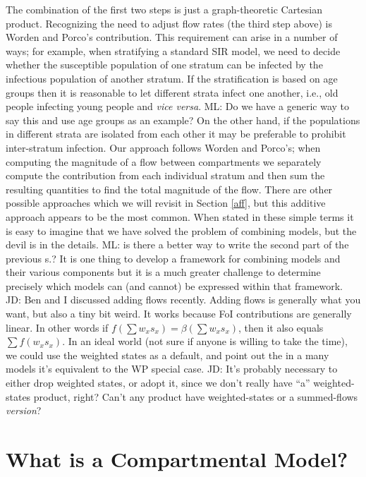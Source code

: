\documentclass[referee,sn-basic]{sn-jnl}%
\theoremstyle{definition}
\newcommand{\jd}[1]{{\color{blue} JD: #1}}
\newcommand{\mli}[1]{{\color{purple} ML: #1}}
\newcommand{\vv}{{\emph{vice versa}\xspace}}
\begin{document}
The combination of the first two steps is just a graph-theoretic Cartesian product. Recognizing the need to adjust flow rates (the third step above) is Worden and Porco's contribution. This requirement can arise in a number of ways; for example, when stratifying a standard SIR model, we need to decide whether the susceptible population of one stratum can be infected by the infectious population of another stratum.
If the stratification is based on age groups then it is reasonable to let different strata infect one another, i.e., old people infecting young people and \vv. \mli{Do we have a generic way to say this and use age groups as an example?}
On the other hand, if the populations in different strata are isolated from each other it may be preferable to prohibit inter-stratum infection. Our approach follows Worden and Porco's; when computing the magnitude of a flow between compartments we separately compute the contribution from each individual stratum and then sum the resulting quantities to find the total magnitude of the flow. There are other possible approaches which we will revisit in Section \ref{aff}, but this additive approach appears to be the most common. When stated in these simple terms it is easy to imagine that we have solved the problem of combining models, but the devil is in the details. \mli{is there a better way to write the second part of the previous s.?} It is one thing to develop a framework for combining models and their various components but it is a much greater challenge to determine precisely which models can (and cannot) be expressed within that framework. 
\jd{Ben and I discussed adding flows recently. Adding flows is generally what you want, but also a tiny bit weird. It works because FoI contributions are generally linear. In other words if $f(\sum w_x s_x) = \beta(\sum w_x s_x)$, then it also equals $\sum f(w_x s_x)$. In an ideal world (not sure if anyone is willing to take the time), we could use the weighted states as a default, and point out the in a many models it's equivalent to the WP special case.}
\jd{It's probably necessary to either drop weighted states, or adopt it, since we don't really have “a” weighted-states product, right? Can't any product have weighted-states or a summed-flows \emph{version}?}



\section{What is a Compartmental Model?}\label{dcm}
\end{document}
